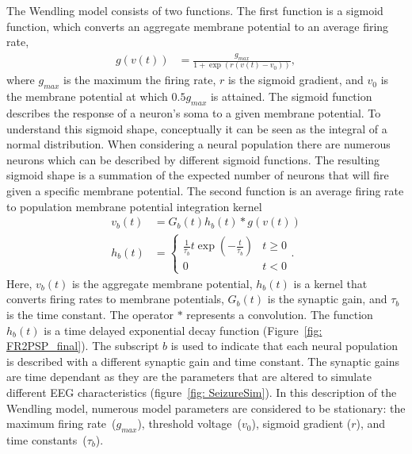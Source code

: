 The Wendling model consists of two functions. The first function is a sigmoid function, which converts an aggregate membrane potential to an average firing rate,\begin{align}%
\label{eqn: Sigmoid}
g(v(t)) &= \frac{g_{max}}{1+\exp(r(v(t)-v_{0}))}, \end{align} where $g_{max}$ is the maximum the firing rate, $r$ is the sigmoid gradient, and $v_{0}$ is the membrane potential at which $0.5g_{max}$ is attained. The sigmoid function describes the response of a neuron's soma to a given membrane potential. To understand this sigmoid shape, conceptually it can be seen as the integral of a normal distribution. When considering a neural population there are numerous neurons which can be described by different sigmoid functions. The resulting sigmoid shape is a summation of the expected number of neurons that will fire given a specific membrane potential. %
The second function is an average firing rate to population membrane potential integration kernel \begin{align} %
\label{eqn: Convert}
v_{b}(t) &= G_{b}(t)h_{b}(t)*g(v(t))\\
\label{eqn: Kernel} 
h_{b}(t) &= \begin{cases} 
\frac{1}{\tau_{b}}t\exp\left(-\frac{t}{\tau_{b}}\right) & t \geq 0\\
0 & t <0
\end{cases}. \end{align} Here, $v_{b}(t)$ is the aggregate membrane potential, $h_{b}(t)$ is a kernel that converts firing rates to membrane potentials, $G_{b}(t)$ is the synaptic gain, and $\tau_{b}$ is the time constant. The operator $*$ represents a convolution. The function $h_{b}(t)$ is a time delayed exponential decay function (Figure~\ref{fig: FR2PSP_final}). The subscript $b$ is used to indicate that each neural population is described with a different synaptic gain and time constant. The synaptic gains are time dependant as they are the parameters that are altered to simulate different EEG characteristics (figure~\ref{fig: SeizureSim}). In this description of the Wendling model, numerous model parameters are considered to be stationary: the maximum firing rate~($g_{max}$), threshold voltage~($v_{0}$), sigmoid gradient ($r$), and time constants~($\tau_{b}$). 

